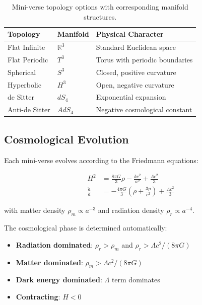 \documentclass[12pt, a4paper]{article}
\begin{document}
\begin{table}[H]
\centering
\begin{tabular}{lll}
\toprule
\textbf{Topology} & \textbf{Manifold} & \textbf{Physical Character} \\
\midrule
Flat Infinite & $\mathbb{R}^3$ & Standard Euclidean space \\
Flat Periodic & $T^3$ & Torus with periodic boundaries \\
Spherical & $S^3$ & Closed, positive curvature \\
Hyperbolic & $H^3$ & Open, negative curvature \\
de Sitter & $dS_4$ & Exponential expansion \\
Anti-de Sitter & $AdS_4$ & Negative cosmological constant \\
\bottomrule
\end{tabular}
\caption{Mini-verse topology options with corresponding manifold structures.}
\label{tab:topologies}
\end{table}

\subsection{Cosmological Evolution}

Each mini-verse evolves according to the Friedmann equations:

\begin{align}
    H^2 &= \frac{8\pi G}{3}\rho - \frac{kc^2}{a^2} + \frac{\Lambda c^2}{3}
    \label{eq:friedmann1} \\
    \frac{\ddot{a}}{a} &= -\frac{4\pi G}{3}\left(\rho + \frac{3p}{c^2}\right)
    + \frac{\Lambda c^2}{3}
    \label{eq:friedmann2}
\end{align}

with matter density $\rho_m \propto a^{-3}$ and radiation density
$\rho_r \propto a^{-4}$.

The cosmological phase is determined automatically:
\begin{itemize}
    \item \textbf{Radiation dominated}: $\rho_r > \rho_m$ and
          $\rho_r > \Lambda c^2 / (8\pi G)$
    \item \textbf{Matter dominated}: $\rho_m > \Lambda c^2 / (8\pi G)$
    \item \textbf{Dark energy dominated}: $\Lambda$ term dominates
    \item \textbf{Contracting}: $H < 0$
\end{itemize}
\end{document}
